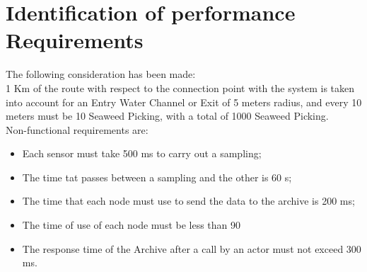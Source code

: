 \newpage \chapter{\textbf{Identification of performance Requirements}}


The following consideration has been made: \\
1 Km of the route with respect to the connection point with the system is taken into account for an Entry Water Channel or Exit of 5 meters radius, and every 10 meters must be 10 Seaweed Picking, with a total of 1000 Seaweed Picking. \\
Non-functional requirements are:
\begin{itemize} 
\item Each sensor must take 500 ms to carry out a sampling;
\item The time tat passes between a sampling and the other is 60 s;
\item The time that each node must use to send the data to the archive 			is 200 ms;
\item The time of use of each node must be less than 90%
\item The response time of the Archive after a call by an actor must not 	exceed 300 ms.
\end{itemize} 
